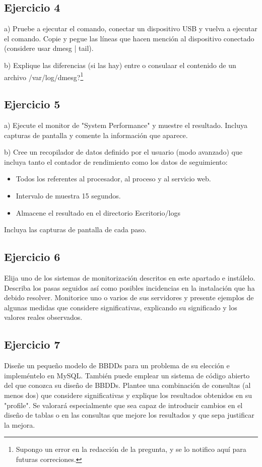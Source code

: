 \documentclass[a4paper, 11pt]{article} %
\begin{document}
\subsection{Ejercicio 4}
a) Pruebe a ejecutar el comando, conectar un dispositivo USB y vuelva a ejecutar el comando. Copie y pegue las líneas que hacen mención al dispositivo conectado (considere usar dmesg | tail). 

b) Explique las diferencias (si las hay) entre o consulaar el contenido de un archivo /var/log/dmesg?\footnote{Supongo un error en la redacción de la pregunta, y se lo notifico aquí para futuras correciones.}

\subsection{Ejercicio 5}
a) Ejecute el monitor de "System Performance" y muestre el resultado. Incluya capturas de pantalla y comente la información que aparece. 

b) Cree un recopilador de datos definido por el usuario (modo avanzado) que incluya tanto el contador de rendimiento como los datos de seguimiento: 
\begin{itemize}
\item Todos los referentes al procesador, al proceso y al servicio web. 
\item Intervalo de muestra 15 segundos.
\item Almacene el resultado en el directorio Escritorio/logs
\end{itemize}
Incluya las capturas de pantalla de cada paso. 

\subsection{Ejercicio 6}
Elija uno de los sistemas de monitorización descritos en este apartado e instálelo. Describa los pasas seguidos así como posibles incidencias en la instalación que ha debido resolver. Monitorice uno o varios de sus servidores y presente ejemplos de algunas medidas que considere significativas, explicando su significado y los valores reales observados. 

\subsection{Ejercicio 7}
Diseñe un pequeño modelo de BBDDs para un problema de su elección e impleméntelo en MySQL. También puede emplear un sistema de código abierto del que conozca su diseño de BBDDs. Plantee una combinación de consultas (al menos dos) que considere significativas y explique los resultados obtenidos en su "profile". Se valorará especialmente que sea capaz de introducir cambios en el diseño de tablas o en las consultas que mejore los resultados y que sepa justificar la mejora. 
\end{document}
